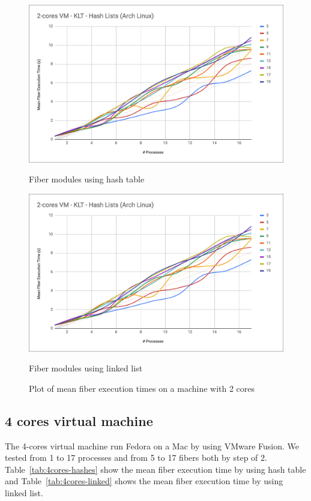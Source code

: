 \documentclass[a4paper,10pt]{article}
\begin{document}
 \begin{figure}[htb!]
   \centering
   \begin{minipage}{0.45\textwidth}%
     \centering
     \includegraphics[width=\textwidth]{imgs/bench-2cores-hash}
     \caption{Fiber modules using hash table}
     \label{fig:2figsA}
   \end{minipage}%
   \qquad
   \begin{minipage}{0.45\textwidth}%
     \centering
     \includegraphics[width=\textwidth]{imgs/bench-2cores-hash}
     \caption{Fiber modules using linked list}
     \label{fig:2figsB}%
   \end{minipage}%
   \caption{Plot of mean fiber execution times on a machine with 2 cores}
 \end{figure}


 \subsection{4 cores virtual machine}
 The 4-cores virtual machine run Fedora on a Mac by using VMware Fusion. We tested from 1 to 17 processes and from 5 to 17 fibers both by step of 2. Table~\ref{tab:4cores-hashes} show the mean fiber execution time by using hash table and Table~\ref{tab:4cores-linked} shows the mean fiber execution time by using linked list.
\end{document}
